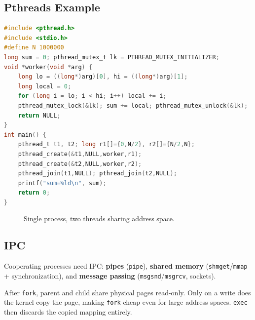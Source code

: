 \subsection{Pthreads Example}
\begin{lstlisting}[language=C,caption={POSIX threads: parallel sum}]
#include <pthread.h>
#include <stdio.h>
#define N 1000000
long sum = 0; pthread_mutex_t lk = PTHREAD_MUTEX_INITIALIZER;
void *worker(void *arg) {
    long lo = ((long*)arg)[0], hi = ((long*)arg)[1];
    long local = 0;
    for (long i = lo; i < hi; i++) local += i;
    pthread_mutex_lock(&lk); sum += local; pthread_mutex_unlock(&lk);
    return NULL;
}
int main() {
    pthread_t t1, t2; long r1[]={0,N/2}, r2[]={N/2,N};
    pthread_create(&t1,NULL,worker,r1);
    pthread_create(&t2,NULL,worker,r2);
    pthread_join(t1,NULL); pthread_join(t2,NULL);
    printf("sum=%ld\n", sum);
    return 0;
}
\end{lstlisting}

\begin{figure}[h!]
\centering
{}
\caption{Single process, two threads sharing address space.}
\label{fig:threads}
\end{figure}

\subsection{IPC}
Cooperating processes need IPC: \textbf{pipes} (\texttt{pipe}), \textbf{shared
memory} (\texttt{shmget}/\texttt{mmap} + synchronization), and
\textbf{message passing} (\texttt{msgsnd}/\texttt{msgrcv}, sockets).

\begin{remark}
After \texttt{fork}, parent and child share physical pages read-only. Only on
a write does the kernel copy the page, making \texttt{fork} cheap even for
large address spaces. \texttt{exec} then discards the copied mapping entirely.
\end{remark}

